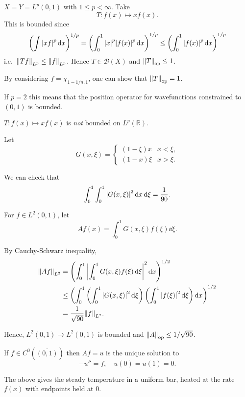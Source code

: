 \documentclass[a4paper,11pt]{article}
\begin{document}
	\begin{ex}
		$X = Y = L^p(0,1)$ with $1 \leq p < \infty$. Take 
		\[
			T : f(x) \mapsto x f(x).
		\]
		This is bounded since 
		\[
			\left( \int \abs{xf}^p \dd{x} \right)^{1/p} = \left( \int_{0}^{1} \abs{x}^p \abs{f(x)}^p \dd{x} \right)^{1/p} \leq \left( \int_{0}^{1} \abs{f(x)}^p \dd{x} \right)^{1/p}
		\]
		i.e.\ $\norm{T f}_{L^p} \leq \norm{f}_{L^p}$. Hence $T \in \mathcal{B}(X)$ and $\norm{T}_{\text{op}} \leq 1$. 

		By considering $f = \chi _{1- 1/n,1}$, one can show that $\norm{T}_{\text{op}} = 1$.

		If $p=2$ this means that the position operator for wavefunctions constrained to $(0,1)$ is bounded.

		\begin{nt}
			$T : f(x) \mapsto xf(x)$ is \emph{not} bounded on $L^p (\mathbb{R})$.
		\end{nt}
	\end{ex}

	\begin{ex}
		Let 
		\[
			G(x,\xi) = \begin{cases}
				(1-\xi) x & x < \xi,\\
				(1-x) \xi & x > \xi.
			\end{cases}
		\]
		
		We can check that 
		\[
			\int_{0}^{1} \int_{0}^{1} \abs{G(x,\xi)}^2 \dd{x}\dd{\xi} = \frac{1}{90}.
		\]

		For $f \in L^2(0,1)$, let 
		\[
			Af(x) = \int_{0}^{1} G(x,\xi) f(\xi) \dd{\xi}.
		\]
		
		By Cauchy-Schwarz inequality, 
		\begin{align*}
			\norm{Af} _{L^2} & = \left( \int_{0}^{1}\abs{\int_{0}^{1} G(x,\xi) f(\xi) \dd{\xi}}^2 \dd{x} \right)^{1/2}\\
			& \leq \left( \int_{0}^{1} \left( \int_{0}^{1} \abs{G(x,\xi)}^2 \dd{\xi} \right) \left( \int_{0}^{1} \abs{f(\xi)}^2 \dd{\xi} \right) \dd{x} \right)^{1/2}\\
			& = \frac{1}{\sqrt{90}} \norm{f}_{L^2}.
		\end{align*}
		
		Hence, $L^2(0,1) \to L^2(0,1)$ is bounded and $\norm{A}_{\text{op}} \leq 1/\sqrt{90}$.

		\begin{nt}
			If $f \in C^0(\overline{(0,1)})$ then $Af = u$ is the unique solution to 
			\[
				-u'' = f, \quad u(0) = u(1) = 0.
			\]
		\end{nt}

		The above gives the steady temperature in a uniform bar, heated at the rate $f(x)$ with endpoints held at $0$. 
	\end{ex}
\end{document}
